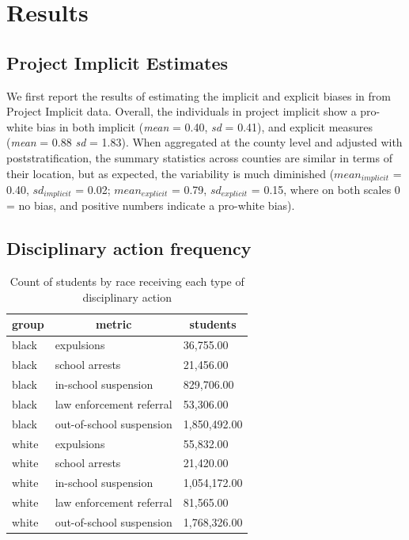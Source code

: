 \documentclass[english,floatsintext,man]{apa6}
\theoremstyle{definition}
\theoremstyle{definition}
\theoremstyle{remark}
\begin{document}
\section{Results}\label{results}

\subsection{Project Implicit
Estimates}\label{project-implicit-estimates}

We first report the results of estimating the implicit and explicit
biases in from Project Implicit data. Overall, the individuals in
project implicit show a pro-white bias in both implicit (\emph{mean} =
0.40, \emph{sd} = 0.41), and explicit measures (\emph{mean} = 0.88
\emph{sd} = 1.83). When aggregated at the county level and adjusted with
poststratification, the summary statistics across counties are similar
in terms of their location, but as expected, the variability is much
diminished (\(mean_{implicit}\) = 0.40, \(sd_{implicit}\) = 0.02;
\(mean_{explicit}\) = 0.79, \(sd_{explicit}\) = 0.15, where on both
scales 0 = no bias, and positive numbers indicate a pro-white bias).

\subsection{Disciplinary action
frequency}\label{disciplinary-action-frequency}

\begin{table}[tbp]
\begin{center}
\begin{threeparttable}
\caption{\label{tab:disc-count}Count of students by race receiving each type of disciplinary action}
\begin{tabular}{lll}
\toprule
group & \multicolumn{1}{c}{metric} & \multicolumn{1}{c}{students}\\
\midrule
black & expulsions & 36,755.00\\
black & school arrests & 21,456.00\\
black & in-school suspension & 829,706.00\\
black & law enforcement referral & 53,306.00\\
black & out-of-school suspension & 1,850,492.00\\
white & expulsions & 55,832.00\\
white & school arrests & 21,420.00\\
white & in-school suspension & 1,054,172.00\\
white & law enforcement referral & 81,565.00\\
white & out-of-school suspension & 1,768,326.00\\
\bottomrule
\end{tabular}
\end{threeparttable}
\end{center}
\end{table}
\end{document}

